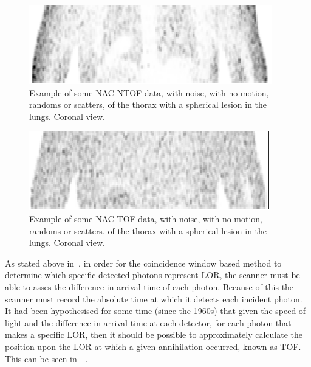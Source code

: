                 \begin{figure}
                    \centering
                    
                    \includegraphics[width=1.0\linewidth]{figures/background_non_tof_example.png}
                    
                    \captionsetup{singlelinecheck=false, justification=raggedright}
                    \caption{Example of some \gls{NAC} \gls{NTOF} data, with noise, with no motion, randoms or scatters, of the thorax with a spherical lesion in the lungs. Coronal view.} \label{fig:time_of_flight_pet_non_tof_example}
                \end{figure}
                
                \begin{figure}
                    \centering
                    
                    \includegraphics[width=1.0\linewidth]{figures/background_tof_example.png}
                    
                    \captionsetup{singlelinecheck=false, justification=raggedright}
                    \caption{Example of some \gls{NAC} \gls{TOF} data, with noise, with no motion, randoms or scatters, of the thorax with a spherical lesion in the lungs. Coronal view.} \label{fig:time_of_flight_pet_tof_example}
                \end{figure}
                
                As stated above in~, in order for the coincidence window based method to determine which specific detected photons represent \gls{LOR}, the scanner must be able to asses the difference in arrival time of each photon. Because of this the scanner must record the absolute time at which it detects each incident photon. It had been hypothesised for some time (since the 1960s) that given the speed of light and the difference in arrival time at each detector, for each photon that makes a specific \gls{LOR}, then it should be possible to approximately calculate the position upon the \gls{LOR} at which a given annihilation occurred, known as \gls{TOF}. This can be seen in~~.
                

